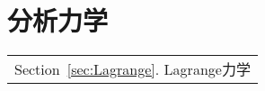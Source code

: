\part{分析力学}\label{Part:Analytical}
	\begin{margintable}\vspace{1.4in}\footnotesize
		\begin{tabularx}{\marginparwidth}{|X}
			Section~\ref{sec:Lagrange}. Lagrange力学\\
		\end{tabularx}
	\end{margintable}

